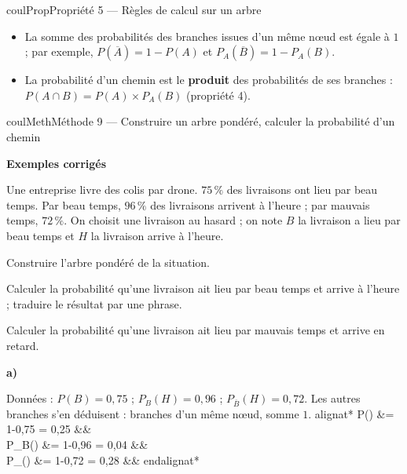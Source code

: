 \documentclass[11pt,a4paper]{article}
\makeatletter
\newlength{\retraitcalculs}
\newcounter{lycee@signet}
\newcommand{\signet}[3][]{\stepcounter{lycee@signet}%
  \edef\lycee@dest{\if\relax\detokenize{#1}\relax
    signet.\arabic{lycee@signet}\else#1\fi}%
  \hypertarget{\lycee@dest}{}\bookmark[level=#2,dest=\lycee@dest]{#3}}
\newcommand{\res}[1]{#1}
\newcounter{methode}
\newenvironment{proprietebox}[1][Propriété]%
  {\begin{boitecours}[phantom={\signet{2}{#1}}]{coulProp}{#1}}{\end{boitecours}}
\newenvironment{methodebox}[1][Méthode]{\stepcounter{methode}%
  \begin{boitecours}[phantom={\signet[methode-\arabic{methode}]{2}{#1}}]{coulMeth}{#1}}%
  {\end{boitecours}}
\newcommand{\etape}[1]{\par\smallskip\textbf{\color{coulMeth}#1}\par\nobreak\smallskip}
\newenvironment{calculs}{\setlength{\jot}{5pt}\@fleqntrue\@mathmargin\retraitcalculs
  \setlength{\abovedisplayskip}{4pt}\setlength{\belowdisplayskip}{4pt}%
  \setlength{\abovedisplayshortskip}{4pt}\setlength{\belowdisplayshortskip}{4pt}%
  \csname alignat*\endcsname{2}}%
  {\csname endalignat*\endcsname}
\newcommand{\cas}[1]{\par\smallskip\noindent\textbf{\color{coulExo}#1}\vadjust{\nobreak}}
\newenvironment{correction}{\par}{\par}
\newcommand{\etapeexemples}{\etape{Exemples corrigés}}
\makeatother
\begin{document}
\begin{proprietebox}[Propriété 5 --- Règles de calcul sur un arbre]
\begin{itemize}
  \item La somme des probabilités des branches issues d'un même nœud est égale à $1$ ;
        par exemple, $P(\overline{A})=1-P(A)$ et $P_A(\overline{B})=1-P_A(B)$.
  \item La probabilité d'un chemin est le \textbf{produit} des probabilités de ses
        branches : $P(A\cap B)=P(A)\times P_A(B)$ (propriété 4).
\end{itemize}
\end{proprietebox}

\begin{methodebox}[Méthode 9 --- Construire un arbre pondéré, calculer la probabilité d'un chemin]
\etapeexemples
Une entreprise livre des colis par drone. $75\,\%$ des livraisons ont lieu par beau temps.
Par beau temps, $96\,\%$ des livraisons arrivent à l'heure ; par mauvais temps, $72\,\%$.
On choisit une livraison au hasard ; on note $B$ \og la livraison a lieu par beau temps\fg{} et
$H$ \og la livraison arrive à l'heure\fg{}.
\begin{questions}[label=\alph*)]
  \item Construire l'arbre pondéré de la situation.
  \item Calculer la probabilité qu'une livraison ait lieu par beau temps et arrive à
        l'heure ; traduire le résultat par une phrase.
  \item Calculer la probabilité qu'une livraison ait lieu par mauvais temps et arrive en
        retard.
\end{questions}
\begin{correction}
\cas{a)}\par\nopagebreak
\begin{minipage}[c]{0.5\linewidth}\raggedright
Données : $P(B)=0{,}75$ ; $P_B(H)=0{,}96$ ; $P_{\overline{B}}(H)=0{,}72$. Les autres
branches s'en déduisent : branches d'un même nœud, somme $1$.
\begin{calculs}
P() &= 1-0{,}75 = \res{0{,}25} &&\\
P_B() &= 1-0{,}96 = \res{0{,}04} &&\\
P_{}() &= 1-0{,}72 = \res{0{,}28} &&
\end{calculs}
\end{minipage}\hfill
\begin{minipage}[c]{0.46\linewidth}\centering
\begin{tikzpicture}

\end{tikzpicture}
\end{minipage}
\end{correction}
\end{methodebox}
\end{document}
